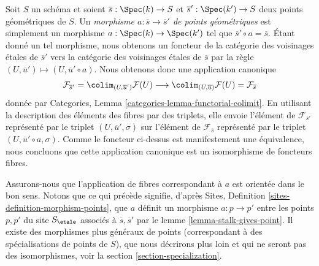 \begin{remark}
\label{remark-map-stalks}
Soit $S$ un sch\'ema et soient $\overline{s} : \Spec(k) \to S$
et $\overline{s}' : \Spec(k') \to S$ deux points g\'eom\'etriques de
$S$. Un {\it morphisme $a : \overline{s} \to \overline{s}'$ de points g\'eom\'etriques}
est simplement un morphisme $a : \Spec(k) \to \Spec(k')$ tel que
$\overline{s}' \circ a = \overline{s}$. \'Etant donn\'e un tel morphisme, nous obtenons
un foncteur de la cat\'egorie des voisinages \'etales de $\overline{s}'$
vers la cat\'egorie des voisinages \'etales de $\overline{s}$ par la r\`egle
$(U, \overline{u}') \mapsto (U, \overline{u}' \circ a)$. Nous obtenons donc
une application canonique
$$
\mathcal{F}_{\overline{s}'}
=
\colim_{(U, \overline{u}')} \mathcal{F}(U)
\longrightarrow
\colim_{(U, \overline{u})} \mathcal{F}(U)
=
\mathcal{F}_{\overline{s}}
$$
donn\'ee par Categories, Lemma \ref{categories-lemma-functorial-colimit}. En utilisant la
description des \'el\'ements des fibres par des triplets, elle envoie l'\'el\'ement de
$\mathcal{F}_{\overline{s}'}$ repr\'esent\'e par le triplet
$(U, \overline{u}', \sigma)$ sur l'\'el\'ement de $\mathcal{F}_{\overline{s}}$
repr\'esent\'e par le triplet $(U, \overline{u}' \circ a, \sigma)$.
Comme le foncteur ci-dessus est manifestement une \'equivalence, nous concluons que cette
application canonique est un isomorphisme de foncteurs fibres.

\medskip\noindent
Assurons-nous que l'application de fibres correspondant \`a $a$ est orient\'ee
dans le bon sens. Notons que ce qui pr\'ec\`ede signifie, d'apr\`es
Sites, Definition \ref{sites-definition-morphism-points},
que $a$ d\'efinit un morphisme $a : p \to p'$ entre les points $p, p'$ du
site $S_\etale$ associ\'es \`a $\overline{s}, \overline{s}'$ par le
lemme \ref{lemma-stalk-gives-point}. Il existe des morphismes plus g\'en\'eraux de
points (correspondant \`a des sp\'ecialisations de points de $S$), que nous
d\'ecrirons plus loin et qui ne seront pas des isomorphismes, voir la section
\ref{section-specialization}.
\end{remark}


